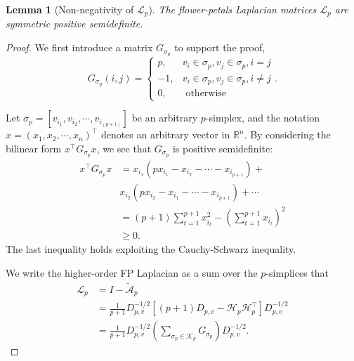 \documentclass[letterpaper]{article} \usepackage{aaai24}
\theoremstyle{plain}
\newtheorem{lemma}[theorem]{Lemma}
\theoremstyle{definition}
\theoremstyle{remark}
\begin{document}
\begin{lemma}[Non-negativity of $\mathcal{L}_p $]
\label{lemma: semi-positive_L}
The flower-petals Laplacian matrices $\mathcal{L}_p $ are symmetric positive semidefinite.
\end{lemma}

\begin{proof}
We first introduce a matrix $G_{\sigma_p}$ to support the proof,
\begin{equation}
    G_{\sigma_p}(i,j) = \left\{
        \begin{array}{cl}
        p, & v_i\in\sigma_p, v_j \in \sigma_p, i = j \\ 
        -1,& v_i\in\sigma_p, v_j \in \sigma_p, i \neq j \\
        0, & \text { otherwise } 
        \end{array}\right. .
\end{equation}

Let $\sigma_p = \left[v_{i_1},v_{i_2},\cdots,v_{i_{(p+1)}}\right]$ be an arbitrary $p$-simplex, and the notation $x=\left(x_1,x_2,\cdots,x_n\right)^\top$ denotes an arbitrary vector in $\mathbb{R}^n$. By considering the bilinear form $x^\top G_{\sigma_p}x$, we see that $G_{\sigma_p}$ is positive semidefinite:
\begin{equation}
    \begin{split}
        x^\top G_{\sigma_p}x  
        &= x_{i_1}\left(px_{i_1}-x_{i_2}-\cdots-x_{i_{p+1}}\right) + \\
        &   x_{i_2}\left(px_{i_2}-x_{i_1}-\cdots-x_{i_{p+1}}\right) + \cdots\\
        & = (p+1)\sum_{t=1}^{p+1}x_{i_t}^2 - \left(\sum_{t=1}^{p+1}x_{i_t}\right)^2\\
        & \geq 0.
    \end{split}
\end{equation}
The last inequality holds exploiting the Cauchy-Schwarz inequality.

We write the higher-order FP Laplacian as a sum over the $p$-simplices that
\begin{equation}
    \begin{split}
       \mathcal{L}_p  
        &= I  - \tilde{\mathcal{A}}_p \\
        & = \frac{1}{p+1}D_{p,v}^{-1/2}\left[(p+1)D_{p,v}-\mathcal{H}_p \mathcal{H}_p^\top \right]D_{p,v}^{-1/2}\\
        & =\frac{1}{p+1}D_{p,v}^{-1/2} \left(\sum_{\sigma_p \in \mathcal{K}_p} G_{\sigma_p}\right) D_{p,v}^{-1/2}.
    \end{split}
\end{equation}


\end{proof}
\end{document}
